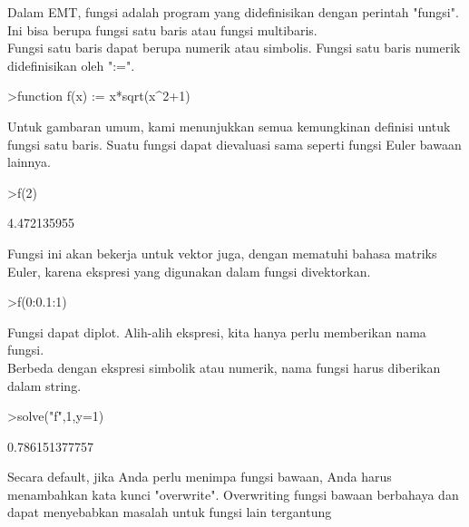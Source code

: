 \documentclass[a4paper,10pt]{article}
\begin{document}
\begin{eulernotebook}
\begin{eulercomment}
\begin{eulercomment}
\begin{eulercomment}
Dalam EMT, fungsi adalah program yang didefinisikan dengan perintah
"fungsi". Ini bisa berupa fungsi satu baris atau fungsi multibaris.\\
Fungsi satu baris dapat berupa numerik atau simbolis. Fungsi satu
baris numerik didefinisikan oleh ":=".
\end{eulercomment}
\begin{eulerprompt}
>function f(x) := x*sqrt(x^2+1)
\end{eulerprompt}
\begin{eulercomment}
Untuk gambaran umum, kami menunjukkan semua kemungkinan definisi untuk
fungsi satu baris. Suatu fungsi dapat dievaluasi sama seperti fungsi
Euler bawaan lainnya.
\end{eulercomment}
\begin{eulerprompt}
>f(2)
\end{eulerprompt}
\begin{euleroutput}
  4.472135955
\end{euleroutput}
\begin{eulercomment}
Fungsi ini akan bekerja untuk vektor juga, dengan mematuhi bahasa
matriks Euler, karena ekspresi yang digunakan dalam fungsi
divektorkan.
\end{eulercomment}
\begin{eulerprompt}
>f(0:0.1:1)
\end{eulerprompt}
\begin{euleroutput}
  [0,  0.100499,  0.203961,  0.313209,  0.430813,  0.559017,  0.699714,
  0.854459,  1.0245,  1.21083,  1.41421]
\end{euleroutput}
\begin{eulercomment}
Fungsi dapat diplot. Alih-alih ekspresi, kita hanya perlu memberikan
nama fungsi.\\
Berbeda dengan ekspresi simbolik atau numerik, nama fungsi harus
diberikan dalam string.
\end{eulercomment}
\begin{eulerprompt}
>solve("f",1,y=1)
\end{eulerprompt}
\begin{euleroutput}
  0.786151377757
\end{euleroutput}
\begin{eulercomment}
Secara default, jika Anda perlu menimpa fungsi bawaan, Anda harus
menambahkan kata kunci "overwrite". Overwriting fungsi bawaan
berbahaya dan dapat menyebabkan masalah untuk fungsi lain tergantung

\end{eulercomment}
\end{eulercomment}
\end{eulercomment}
\end{eulernotebook}
\end{document}
